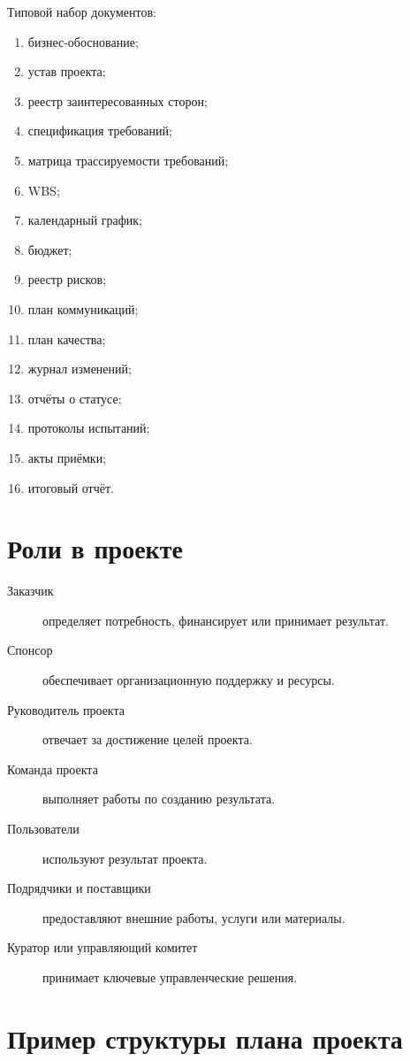 \documentclass[12pt,a4paper]{article}
\begin{document}
Типовой набор документов:
\begin{enumerate}
    \item бизнес-обоснование;
    \item устав проекта;
    \item реестр заинтересованных сторон;
    \item спецификация требований;
    \item матрица трассируемости требований;
    \item WBS;
    \item календарный график;
    \item бюджет;
    \item реестр рисков;
    \item план коммуникаций;
    \item план качества;
    \item журнал изменений;
    \item отчёты о статусе;
    \item протоколы испытаний;
    \item акты приёмки;
    \item итоговый отчёт.
\end{enumerate}

\section{Роли в проекте}

\begin{description}
    \item[Заказчик] определяет потребность, финансирует или принимает результат.
    \item[Спонсор] обеспечивает организационную поддержку и ресурсы.
    \item[Руководитель проекта] отвечает за достижение целей проекта.
    \item[Команда проекта] выполняет работы по созданию результата.
    \item[Пользователи] используют результат проекта.
    \item[Подрядчики и поставщики] предоставляют внешние работы, услуги или материалы.
    \item[Куратор или управляющий комитет] принимает ключевые управленческие решения.
\end{description}

\section{Пример структуры плана проекта}
\end{document}
